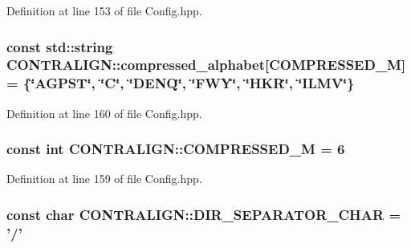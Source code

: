 Definition at line 153 of file Config.\+hpp.

\hypertarget{namespace_c_o_n_t_r_a_l_i_g_n_abc81d204924eda147b14d8d4da2b3f21}{
\subsubsection[{compressed\+\_\+alphabet}]{\setlength{\rightskip}{0pt plus 5cm}const std\+::string C\+O\+N\+T\+R\+A\+L\+I\+G\+N\+::compressed\+\_\+alphabet\mbox{[}{\bf C\+O\+M\+P\+R\+E\+S\+S\+E\+D\+\_\+\+M}\mbox{]} = \{\char`\"{}A\+G\+P\+S\+T\char`\"{}, \char`\"{}C\char`\"{}, \char`\"{}D\+E\+N\+Q\char`\"{}, \char`\"{}F\+W\+Y\char`\"{}, \char`\"{}H\+K\+R\char`\"{}, \char`\"{}I\+L\+M\+V\char`\"{}\}}}\label{namespace_c_o_n_t_r_a_l_i_g_n_abc81d204924eda147b14d8d4da2b3f21}


Definition at line 160 of file Config.\+hpp.

\hypertarget{namespace_c_o_n_t_r_a_l_i_g_n_a28d4592514704ed3e73d954d34bd4128}{
\subsubsection[{C\+O\+M\+P\+R\+E\+S\+S\+E\+D\+\_\+\+M}]{\setlength{\rightskip}{0pt plus 5cm}const int C\+O\+N\+T\+R\+A\+L\+I\+G\+N\+::\+C\+O\+M\+P\+R\+E\+S\+S\+E\+D\+\_\+\+M = 6}}\label{namespace_c_o_n_t_r_a_l_i_g_n_a28d4592514704ed3e73d954d34bd4128}


Definition at line 159 of file Config.\+hpp.

\hypertarget{namespace_c_o_n_t_r_a_l_i_g_n_a10799300da481510c609583326c3bcaa}{
\subsubsection[{D\+I\+R\+\_\+\+S\+E\+P\+A\+R\+A\+T\+O\+R\+\_\+\+C\+H\+A\+R}]{\setlength{\rightskip}{0pt plus 5cm}const char C\+O\+N\+T\+R\+A\+L\+I\+G\+N\+::\+D\+I\+R\+\_\+\+S\+E\+P\+A\+R\+A\+T\+O\+R\+\_\+\+C\+H\+A\+R = '/'}}\label{namespace_c_o_n_t_r_a_l_i_g_n_a10799300da481510c609583326c3bcaa}



